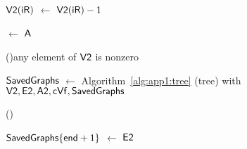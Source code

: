 \begin{vAlgorithm}[!ht]{01\columnwidth}{0em}
{        $\textup{\textsf{V2}}(\textup{\textsf{iR}})$ $\leftarrow$ $\textup{\textsf{V2}}(\textup{\textsf{iR}})-1$ 
	
         $\leftarrow$ $\textup{\textsf{A}}$ 

		\uIf(){any element of $\textup{\textsf{V2}}$ is nonzero\label{alg:app1:tree-if}}{
		
            $\textup{\textsf{SavedGraphs}}$ $\leftarrow$ Algorithm~\ref{alg:app1:tree} (tree) with $\textup{\textsf{V2}}, \textup{\textsf{E2}}, \textup{\textsf{A2}}, \textup{\textsf{cVf}}, \textup{\textsf{SavedGraphs}}$ %
            
        }
        	
        \Else(\label{alg:app1:tree-else}){
      
            $\textup{\textsf{SavedGraphs}}\{\textup{\textsf{end}} + 1\}$  $\leftarrow$ $\textup{\textsf{E2}}$ 
        	
        }
	
	} %

\end{vAlgorithm}
